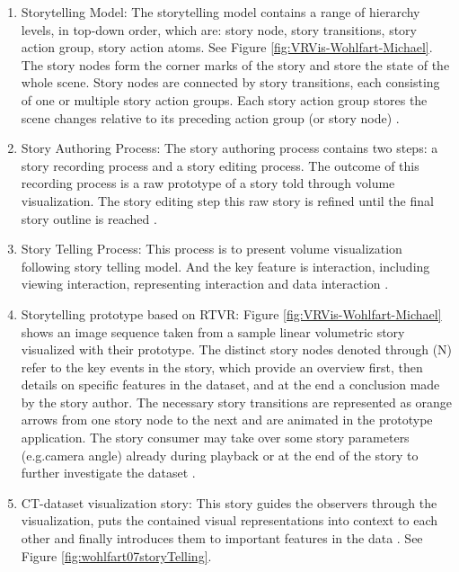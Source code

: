 \documentclass{egpubl}
\begin{document}
\begin{enumerate}
\item Storytelling Model: The storytelling model contains a range of hierarchy levels, in top-down order, which are: story node, story transitions, story action group, story action atoms. See Figure \ref{fig:VRVis-Wohlfart-Michael}. The story nodes form the corner marks of the story and store the state of the whole scene. Story nodes are connected by story transitions, each consisting of one or multiple story action groups. Each story action group stores the scene changes relative to its preceding action group (or story node) \cite{wohlfat,wohlfart2}.

\item Story Authoring Process: The story authoring process contains two steps: a story recording process and a story editing process. The outcome of this recording process is a raw prototype of a story told through volume visualization. The story editing step this raw story is refined until the final story outline is reached \cite{wohlfat,wohlfart2}.
\item Story Telling Process: This process is to present volume visualization following story telling model. And the key feature is interaction, including viewing interaction, representing interaction and data interaction \cite{wohlfat,wohlfart2}.
\item Storytelling prototype based on RTVR: Figure \ref{fig:VRVis-Wohlfart-Michael} shows an image sequence taken from a sample linear volumetric story visualized with their prototype. The distinct story nodes denoted through (N) refer to the key events in the story, which provide an overview first, then details on specific features in the dataset, and at the end a conclusion made by the story author. The necessary story transitions are represented as orange arrows from one story node to the next and are animated in the prototype application. The story consumer may take over some story parameters (e.g.camera angle) already during playback or at the end of the story to further investigate the dataset \cite{wohlfat,wohlfart2}.
\item CT-dataset visualization story: This story guides the observers through the visualization, puts the contained visual representations
into context to each other and finally introduces them to important features in the data \cite{wohlfart2}. See Figure \ref{fig:wohlfart07storyTelling}.
\end{enumerate}
\end{document}
